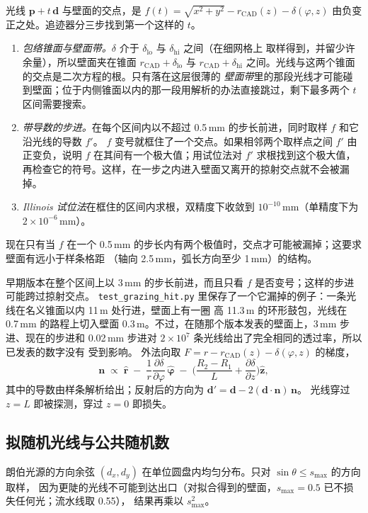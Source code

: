 \documentclass[11pt,a4paper,fontset=fandol]{ctexart}
\newcommand{\um}{\,\textmu m}
\newcommand{\code}[1]{\texttt{#1}}
\begin{document}
光线 $\mathbf p+t\,\mathbf d$ 与壁面的交点，是
$f(t)=\sqrt{x^2+y^2}-r_\mathrm{CAD}(z)-\delta(\varphi,z)$ 由负变正之处。追迹器分三步找到第一个这样的 $t$。
\begin{enumerate}
\item \emph{包络锥面与壁面带。}$\delta$ 介于 $\delta_\mathrm{lo}$ 与 $\delta_\mathrm{hi}$ 之间（在细网格上
取样得到，并留少许余量），所以壁面夹在锥面 $r_\mathrm{CAD}+\delta_\mathrm{lo}$ 与
$r_\mathrm{CAD}+\delta_\mathrm{hi}$ 之间。光线与这两个锥面的交点是二次方程的根。只有落在这层很薄的
\emph{壁面带}里的那段光线才可能碰到壁面；位于内侧锥面以内的那一段用解析的办法直接跳过，剩下最多两个
$t$ 区间需要搜索。
\item \emph{带导数的步进。}在每个区间内以不超过 0.5\,mm 的步长前进，同时取样 $f$ 和它沿光线的导数 $f'$。
$f$ 变号就框住了一个交点。如果相邻两个取样点之间 $f'$ 由正变负，说明 $f$ 在其间有一个极大值；用试位法对
$f'$ 求根找到这个极大值，再检查它的符号。这样，在一步之内进入壁面又离开的掠射交点就不会被漏掉。
\item \emph{Illinois 试位法}在框住的区间内求根，双精度下收敛到 $10^{-10}$\,mm（单精度下为
$2\times10^{-6}$\,mm）。
\end{enumerate}
现在只有当 $f$ 在一个 0.5\,mm 的步长内有两个极值时，交点才可能被漏掉；这要求壁面有远小于样条格距
（轴向 2.5\,mm，弧长方向至少 1\,mm）的结构。

早期版本在整个区间上以 3\,mm 的步长前进，而且只看 $f$ 是否变号；这样的步进可能跨过掠射交点。
\code{test\_grazing\_hit.py} 里保存了一个它漏掉的例子：一条光线在名义锥面以内 11\um{} 处行进，壁面上有一圈
高 11.3\um{} 的环形鼓包，光线在 0.7\,mm 的路程上切入壁面 0.3\um。不过，在随那个版本发表的壁面上，3\,mm
步进、现在的步进和 0.02\,mm 步进对 $2\times10^{7}$ 条光线给出了完全相同的透过率，所以已发表的数字没有
受到影响。
外法向取 $F=r-r_\mathrm{CAD}(z)-\delta(\varphi,z)$ 的梯度，
\[
  \mathbf n \;\propto\; \hat{\mathbf r} \;-\; \frac{1}{r}\frac{\partial\delta}{\partial\varphi}\,\hat{\boldsymbol\varphi}
  \;-\;\Big(\frac{R_2-R_1}{L}+\frac{\partial\delta}{\partial z}\Big)\hat{\mathbf z},
\]
其中的导数由样条解析给出；反射后的方向为 $\mathbf d' = \mathbf d-2(\mathbf d\cdot\mathbf n)\,\mathbf n$。
光线穿过 $z=L$ 即被探测，穿过 $z=0$ 即损失。

\subsection{拟随机光线与公共随机数}

朗伯光源的方向余弦 $(d_x,d_y)$ 在单位圆盘内均匀分布。只对 $\sin\theta\le s_\mathrm{max}$ 的方向取样，
因为更陡的光线不可能到达出口（对拟合得到的壁面，$s_\mathrm{max}=0.5$ 已不损失任何光；流水线取 0.55），
结果再乘以 $s_\mathrm{max}^2$。
\end{document}

